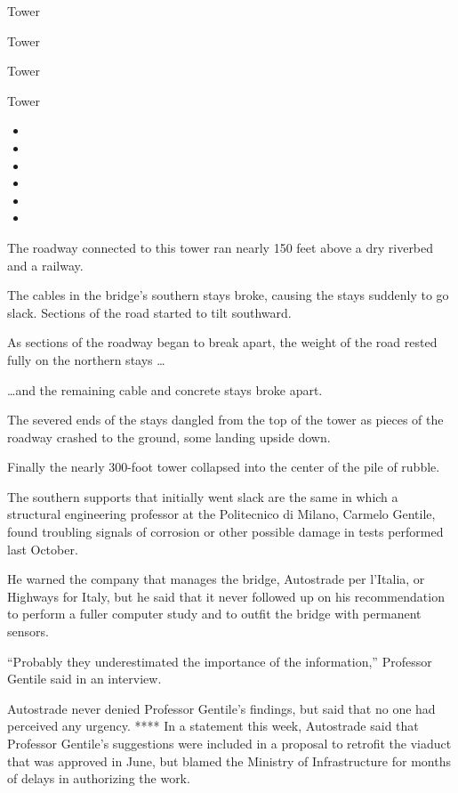 Tower

Tower

Tower

Tower

\begin{itemize}
\item
\item
\item
\item
\item
\item
\end{itemize}

The roadway connected to this tower ran nearly 150 feet above a dry
riverbed and a railway.

The cables in the bridge's southern stays broke, causing the stays
suddenly to go slack. Sections of the road started to tilt southward.

As sections of the roadway began to break apart, the weight of the road
rested fully on the northern stays \ldots{}

\ldots{}and the remaining cable and concrete stays broke apart.

The severed ends of the stays dangled from the top of the tower as
pieces of the roadway crashed to the ground, some landing upside down.

Finally the nearly 300-foot tower collapsed into the center of the pile
of rubble.

The southern supports that initially went slack are the same in which a
structural engineering professor at the Politecnico di Milano, Carmelo
Gentile, found troubling signals of corrosion or other possible damage
in tests performed last October.

He warned the company that manages the bridge, Autostrade per l'Italia,
or Highways for Italy, but he said that it never followed up on his
recommendation to perform a fuller computer study and to outfit the
bridge with permanent sensors.

``Probably they underestimated the importance of the information,''
Professor Gentile said in an interview.

Autostrade never denied Professor Gentile's findings, but said that no
one had perceived any urgency. **** In a statement this week, Autostrade
said that Professor Gentile's suggestions were included in a proposal to
retrofit the viaduct that was approved in June, but blamed the Ministry
of Infrastructure for months of delays in authorizing the work.

